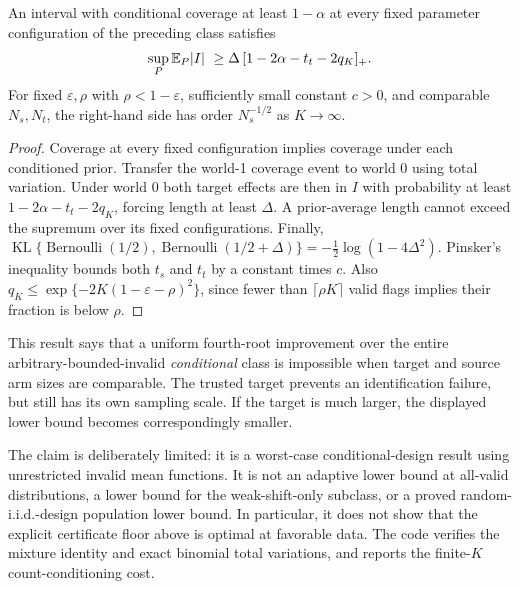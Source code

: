 \begin{proposition}
An interval with conditional coverage at least $1-\alpha$ at every fixed
parameter configuration of the preceding class satisfies
\[
 \sup_P\mathbb E_P|I|\ \ge
 \Delta\,[1-2\alpha-t_t-2q_K]_+.
\]
For fixed $\varepsilon,\rho$ with $\rho<1-\varepsilon$, sufficiently small
constant $c>0$, and comparable $N_s,N_t$, the right-hand side has order
$N_s^{-1/2}$ as $K\to\infty$.
\end{proposition}

\begin{proof}
Coverage at every fixed configuration implies coverage under each conditioned
prior. Transfer the world-1 coverage event to world 0 using total variation.
Under world 0 both target effects are then in $I$ with probability at least
$1-2\alpha-t_t-2q_K$, forcing length at least $\Delta$. A prior-average length
cannot exceed the supremum over its fixed configurations. Finally,
$\operatorname{KL}\{\operatorname{Bernoulli}(1/2),
\operatorname{Bernoulli}(1/2+\Delta)\}
=-\tfrac12\log(1-4\Delta^2)$. Pinsker's inequality bounds both $t_s$ and
$t_t$ by a constant times $c$. Also
$q_K\le\exp\{-2K(1-\varepsilon-\rho)^2\}$, since fewer than
$\lceil\rho K\rceil$ valid flags implies their fraction is below $\rho$.
\end{proof}

This result says that a uniform fourth-root improvement over the entire
arbitrary-bounded-invalid \emph{conditional} class is impossible when target
and source arm sizes are comparable. The trusted target prevents an
identification failure, but still has its own sampling scale. If the target
is much larger, the displayed lower bound becomes correspondingly smaller.

The claim is deliberately limited: it is a worst-case conditional-design
result using unrestricted invalid mean functions. It is not an adaptive lower
bound at all-valid distributions, a lower bound for the weak-shift-only
subclass, or a proved random-i.i.d.-design population lower bound. In
particular, it does not show that the explicit certificate floor above is
optimal at favorable data. The code verifies the mixture identity and exact
binomial total variations, and reports the finite-$K$ count-conditioning cost.
